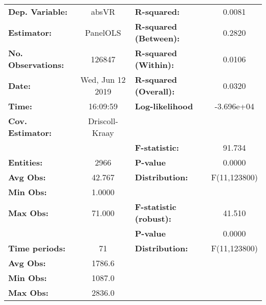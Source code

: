 \begin{center}
\begin{tabular}{lclc}
\toprule
\textbf{Dep. Variable:}                 &       absVR        & \textbf{  R-squared:         }   &      0.0081      \\
\textbf{Estimator:}                     &      PanelOLS      & \textbf{  R-squared (Between):}  &      0.2820      \\
\textbf{No. Observations:}              &       126847       & \textbf{  R-squared (Within):}   &      0.0106      \\
\textbf{Date:}                          &  Wed, Jun 12 2019  & \textbf{  R-squared (Overall):}  &      0.0320      \\
\textbf{Time:}                          &      16:09:59      & \textbf{  Log-likelihood     }   &    -3.696e+04    \\
\textbf{Cov. Estimator:}                &   Driscoll-Kraay   & \textbf{                     }   &                  \\
\textbf{}                               &                    & \textbf{  F-statistic:       }   &      91.734      \\
\textbf{Entities:}                      &        2966        & \textbf{  P-value            }   &      0.0000      \\
\textbf{Avg Obs:}                       &       42.767       & \textbf{  Distribution:      }   &   F(11,123800)   \\
\textbf{Min Obs:}                       &       1.0000       & \textbf{                     }   &                  \\
\textbf{Max Obs:}                       &       71.000       & \textbf{  F-statistic (robust):} &      41.510      \\
\textbf{}                               &                    & \textbf{  P-value            }   &      0.0000      \\
\textbf{Time periods:}                  &         71         & \textbf{  Distribution:      }   &   F(11,123800)   \\
\textbf{Avg Obs:}                       &       1786.6       & \textbf{                     }   &                  \\
\textbf{Min Obs:}                       &       1087.0       & \textbf{                     }   &                  \\
\textbf{Max Obs:}                       &       2836.0       & \textbf{                     }   &                  \\

\end{tabular}
\end{center}
